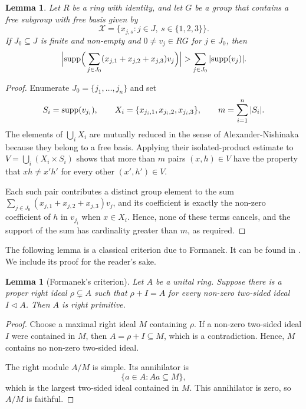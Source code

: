 \documentclass[11pt]{article}
\newtheorem{lem}[thm]{Lemma}
\theoremstyle{definition}
\theoremstyle{remark}
\numberwithin{equation}{section}
\numberwithin{equation}{section}
\numberwithin{equation}{section}
\begin{document}
\begin{lem}\label{AN}
Let $R$ be a ring with identity, and let $G$ be a group that contains a free subgroup with free basis given by
$$
 \mathcal X=\{x_{j,s}:j\in J,\ s\in\{1,2,3\}\}.
$$
If $J_0\subseteq J$ is finite and non-empty and $0\neq v_j\in R G$ for $j\in J_0$, then
$$
 \Big|
 {\rm supp}\Big(\sum_{j\in J_0}
 (x_{j,1}+x_{j,2}+x_{j,3})v_j\Big)
 \Big|
 >\sum_{j\in J_0}|{\rm supp}(v_j)|.
$$
\end{lem}

\begin{proof}
Enumerate $J_0=\{j_1,\ldots,j_n\}$ and set
$$
 S_i={\rm supp}(v_{j_i}),\qquad
 X_i=\{x_{j_i,1},x_{j_i,2},x_{j_i,3}\},\qquad
 m=\sum_{i=1}^n|S_i|.
$$
The elements of $\bigcup_iX_i$ are mutually reduced in the sense of Alexander-Nishinaka because they belong to a free basis. Applying their isolated-product estimate \cite[Lemma 3.5]{AlNi17} to $V=\bigcup_i(X_i\times S_i)$ shows that more than $m$ pairs $(x,h)\in V$ have the property that $xh\neq x'h'$ for every other $(x',h')\in V$.

Each such pair contributes a distinct group element to the sum $\sum_{j\in J_0}
 (x_{j,1}+x_{j,2}+x_{j,3})v_j$, and its coefficient is exactly the non-zero coefficient of $h$ in $v_{j_i}$ when $x\in X_i$. Hence, none of these terms cancels, and the support of the sum has cardinality greater than $m$, as required.
\end{proof}

The following lemma is a classical criterion due to Formanek. It can be found in \cite[Theorem 1]{Fo73}. We include its proof for the reader's sake.

\begin{lem}[Formanek's criterion]\label{formanek}
Let $A$ be a unital ring. Suppose there is a proper right ideal $\rho\subsetneq A$ such that $\rho+I=A$ for every non-zero two-sided ideal $I\triangleleft A$. Then $A$ is right primitive.
\end{lem}

\begin{proof}
Choose a maximal right ideal $M$ containing $\rho$.  If a non-zero two-sided ideal $I$ were contained in $M$, then $A=\rho+I\subseteq M$, which is a contradiction. Hence, $M$ contains no non-zero
two-sided ideal.

The right module $A/M$ is simple. Its annihilator is
$$
 \{a\in A:Aa\subseteq M\},
$$
which is the largest two-sided ideal contained in $M$. This annihilator is zero, so $A/M$ is faithful. \end{proof}
\end{document}
